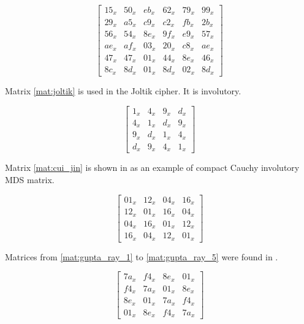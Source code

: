 \begin{equation}\label{mat:photon_a288-inv}
  \begin{bmatrix}
  15_x & 50_x & eb_x & 62_x & 79_x & 99_x\\
  29_x & a5_x & c9_x & c2_x & fb_x & 2b_x\\
  56_x & 54_x & 8e_x & 9f_x & e9_x & 57_x\\
  ae_x & af_x & 03_x & 20_x & c8_x & ae_x\\
  47_x & 47_x & 01_x & 44_x & 8e_x & 46_x\\
  8c_x & 8d_x & 01_x & 8d_x & 02_x & 8d_x
  \end{bmatrix}
\end{equation}

Matrix \eqref{mat:joltik} is used in the Joltik \cite{joltik2015} cipher. It is involutory.

\begin{equation}\label{mat:joltik}
\begin{bmatrix}
	1_x & 4_x & 9_x & d_x\\
	4_x & 1_x & d_x & 9_x\\
	9_x & d_x & 1_x & 4_x\\
	d_x & 9_x & 4_x & 1_x
\end{bmatrix}
\end{equation}

Matrix \eqref{mat:cui_jin} is shown in \cite{CuiJin2015} as an example of compact Cauchy involutory MDS matrix.

\begin{equation}\label{mat:cui_jin}
\begin{bmatrix}
01_x & 12_x & 04_x & 16_x\\
12_x & 01_x & 16_x & 04_x\\
04_x & 16_x & 01_x & 12_x\\
16_x & 04_x & 12_x & 01_x
\end{bmatrix}
\end{equation}

Matrices from \eqref{mat:gupta_ray_1} to \eqref{mat:gupta_ray_5} were found in \cite{Gupta2013OnCO}.

\begin{equation}\label{mat:gupta_ray_1}
\begin{bmatrix}
7a_x & f4_x & 8e_x & 01_x\\
f4_x & 7a_x & 01_x & 8e_x\\
8e_x & 01_x & 7a_x & f4_x\\
01_x & 8e_x & f4_x & 7a_x
\end{bmatrix}
\end{equation}

